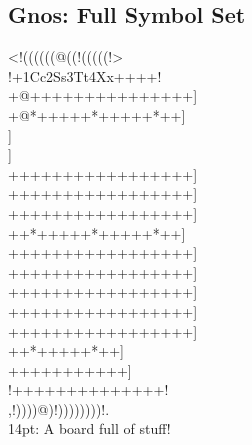 \documentclass{article}
\begin{document}
\newpage
\begin{center}
\section*{Gnos: Full Symbol Set}
\vspace{12pt}
{
{
\gnos%
<!((((((@((!(((((!>\\
!+1Cc2Ss3Tt4Xx++++!\\
+@+++++++++++++++]\\
+@*+++++*+++++*++]\\}
{\gnosb{}}{\gnos]\\}
{\gnosw{}}{\gnos]\\
+++++++++++++++++]\\
+++++++++++++++++]\\
+++++++++++++++++]\\
++*+++++*+++++*++]\\
+++++++++++++++++]\\
+++++++++++++++++]\\
+++++++++++++++++]\\
+++++++++++++++++]\\
+++++++++++++++++]\\
++*{\gnoswi{}}{\gnoswii{}}{\gnoswiii{}}{\gnosbi{}}{\gnosbii{}}{\gnosbiii{}}+++++*++]\\
++++{\gnoswl{}}{\gnosbl{}}+++++++]\\
!++++++++++++++!\\
,!))))@)!))))))))!.\\
}}
14pt: A board full of stuff!




\end{center}
\end{document}
